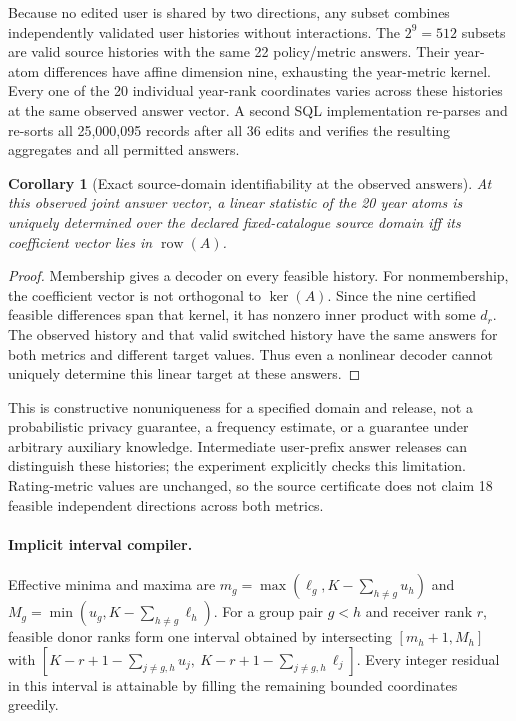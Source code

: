 \documentclass[10pt]{article}
\newtheorem{corollary}{Corollary}
\newcommand{\row}{\operatorname{row}}
\begin{document}
Because no edited user is shared by two directions, any subset combines
independently validated user histories without interactions. The $2^9=512$
subsets are valid source histories with the same 22 policy/metric answers.
Their year-atom differences have affine dimension nine, exhausting the
year-metric kernel. Every one of the 20 individual year-rank coordinates varies
across these histories at the same observed answer vector. A second SQL
implementation re-parses and re-sorts all 25,000,095 records after all 36 edits
and verifies the resulting aggregates and all permitted answers.

\begin{corollary}[Exact source-domain identifiability at the observed answers]
At this observed joint answer vector, a linear statistic of the 20 year atoms
is uniquely determined over the declared fixed-catalogue source domain iff
its coefficient vector lies in $\row(A)$.
\end{corollary}
\begin{proof}
Membership gives a decoder on every feasible history. For nonmembership,
the coefficient vector is not orthogonal to $\ker(A)$. Since the nine certified
feasible differences span that kernel, it has nonzero inner product with some
$d_r$. The observed history and that valid switched history have the same
answers for both metrics and different target values. Thus even a nonlinear
decoder cannot uniquely determine this linear target at these answers.
\end{proof}

This is constructive nonuniqueness for a specified domain and release, not a
probabilistic privacy guarantee, a frequency estimate, or a guarantee under
arbitrary auxiliary knowledge. Intermediate user-prefix answer releases can
distinguish these histories; the experiment explicitly checks this limitation.
Rating-metric values are unchanged, so the source certificate does not claim
18 feasible independent directions across both metrics.

\paragraph{Implicit interval compiler.}
Effective minima and maxima are
$m_g=\max(\ell_g,K-\sum_{h\ne g}u_h)$ and
$M_g=\min(u_g,K-\sum_{h\ne g}\ell_h)$.
For a group pair $g<h$ and receiver rank $r$, feasible donor ranks form one
interval obtained by intersecting $[m_h+1,M_h]$ with
$[K-r+1-\sum_{j\ne g,h}u_j,\ K-r+1-\sum_{j\ne g,h}\ell_j]$.
Every integer residual in this interval is attainable by filling the remaining
bounded coordinates greedily.
\end{document}
